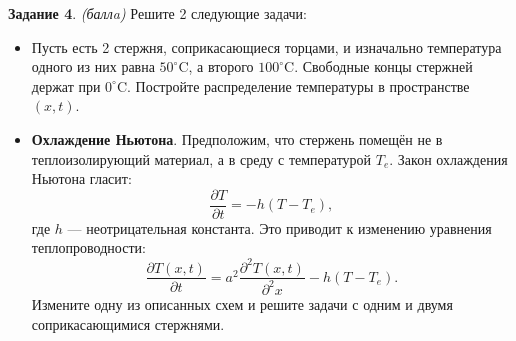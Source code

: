 \documentclass[12pt]{article}
\newcommand{\task}[2]{\vspace{6pt}
\textbf{Задание #1}. #2 %
}
\begin{document}
\task{4}{\textit{(баллa)}} Решите 2 следующие задачи:
\begin{itemize}
\item Пусть есть 2 стержня, соприкасающиеся торцами, и изначально температура одного из них равна $50^\circ \mathrm{C}$, а второго $100^\circ \mathrm{C}$. Свободные концы стержней держат при $0^\circ \mathrm{C}$. Постройте распределение температуры в пространстве $(x,t)$.
\item \textbf{Охлаждение Ньютона}. Предположим, что стержень помещён не в теплоизолирующий материал, а в среду с температурой $T_e$. Закон охлаждения Ньютона гласит:
\[\frac{\partial T}{\partial t}=-h(T-T_e),\]
где $h$ --- неотрицательная константа. Это приводит к изменению уравнения теплопроводности:
\[\frac{\partial T(x, t)}{\partial t}=a^2\frac{\partial^2 T(x, t)}{\partial^2 x}-h(T-T_e).\]
Измените одну из описанных схем и решите задачи с одним и двумя соприкасающимися стержнями.
\end{itemize}
\end{document}
